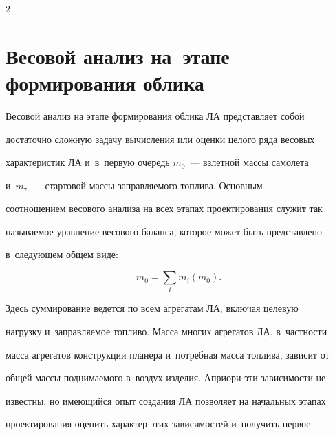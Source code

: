 \begin{multicols}{2}
\begin{figure}




\end{figure}










\section{Весовой анализ на~этапе формирования облика}










  Весовой анализ на этапе формирования облика ЛА представляет собой 


достаточно слож\-ную задачу вы\-чис\-ле\-ния или оценки целого ряда весовых 


характеристик ЛА и~в~первую очередь $m_0$~--- взлетной массы самолета 


и~$m_{\mathrm{т}}$~--- стартовой массы заправляемого топлива. Основным 


соотношением весового анализа на всех этапах проектирования служит так 


на\-зы\-ва\-емое уравнение весового баланса, которое может быть пред\-став\-ле\-но 


в~сле\-ду\-ющем общем \mbox{виде}:


  $$


  m_0=\sum\limits_i m_i(m_0).


  $$


  Здесь суммирование ведется по всем агрегатам ЛА, включая целевую 


нагрузку и~за\-прав\-ля\-емое топ\-ли\-во. Масса многих агрегатов ЛА, в~част\-ности 


масса агрегатов конструкции планера и~потребная масса топ\-ли\-ва, зависит от 


общей массы поднимаемого в~воздух изделия. Априори эти зависимости не 


известны, но име\-ющий\-ся опыт создания ЛА позволяет на начальных этапах 


проектирования оценить характер этих зависимостей и~получить первое 



\end{multicols}
